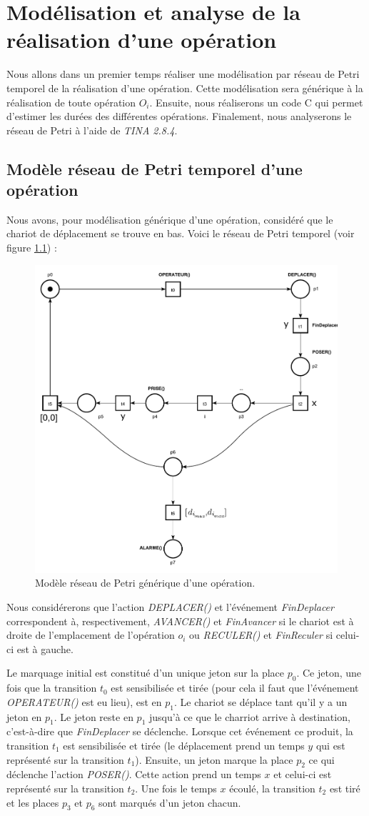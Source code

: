 \chapter{Modélisation et analyse de la réalisation d'une opération}
Nous allons dans un premier temps réaliser une modélisation par réseau de Petri temporel de la réalisation d'une opération. Cette modélisation sera générique à la réalisation de toute opération $O_i$. Ensuite, nous réaliserons un code C qui permet d'estimer les durées des différentes opérations. Finalement, nous analyserons le réseau de Petri à l'aide de \emph{TINA 2.8.4}.

\section{Modèle réseau de Petri temporel d'une opération}
Nous avons, pour modélisation générique d'une opération, considéré que le chariot de déplacement se trouve en bas. Voici le réseau de Petri temporel (voir figure \ref{fig:RdPTempo_generique}) : \\
\begin{figure}[!ht]
\centering
\includegraphics[width=.57\textwidth]{./I/images/III-1_v3.pdf}
\caption{\label{fig:RdPTempo_generique}Modèle réseau de Petri générique d'une opération.}
\end{figure}


Nous considérerons que l'action \emph{DEPLACER()} et l'événement \emph{FinDeplacer} correspondent à, respectivement, \emph{AVANCER()} et \emph{FinAvancer} si le chariot est à droite de l'emplacement de l'opération $o_i$  ou \emph{RECULER()} et \emph{FinReculer} si celui-ci est à gauche.


Le marquage initial est constitué d'un unique jeton sur la place $p_0$. Ce jeton, une fois que la transition $t_0$ est sensibilisée et tirée (pour cela il faut que l'événement \emph{OPERATEUR()} est eu lieu), est en $p_1$. Le chariot se déplace tant qu'il y a un jeton en $p_1$. Le jeton reste en $p_1$ jusqu'à ce que le charriot arrive à destination, c'est-à-dire que \emph{FinDeplacer} se déclenche. Lorsque cet événement ce produit, la transition $t_1$ est sensibilisée et tirée (le déplacement prend un temps $y$ qui est représenté sur la transition $t_1$). Ensuite, un jeton marque la place $p_2$ ce qui déclenche l'action \emph{POSER()}. Cette action prend un temps $x$ et celui-ci est représenté sur la transition $t_2$. Une fois le temps $x$ écoulé, la transition $t_2$ est tiré et les places $p_3$ et $p_6$ sont marqués d'un jeton chacun. 

